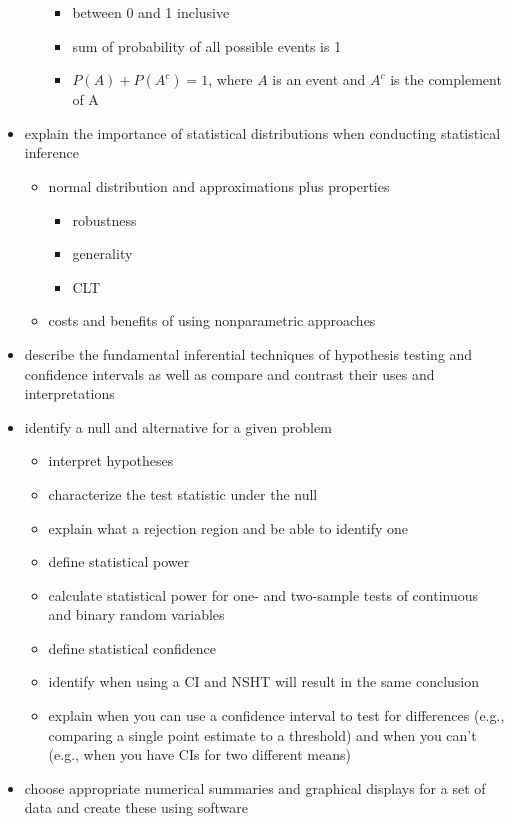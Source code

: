 \documentclass[]{book}
\providecommand{\tightlist}{%
  \setlength{\itemsep}{0pt}\setlength{\parskip}{0pt}}
\theoremstyle{definition}
\theoremstyle{definition}
\theoremstyle{definition}
\theoremstyle{remark}
\begin{document}
\begin{itemize}
\begin{itemize}
    \begin{itemize}
    \tightlist
    \item
      between 0 and 1 inclusive
    \item
      sum of probability of all possible events is 1
    \item
      \(P(A) + P(A^c) = 1\), where \(A\) is an event and \(A^c\) is the
      complement of A
    \end{itemize}
  \end{itemize}
\item
  explain the importance of statistical distributions when conducting
  statistical inference

  \begin{itemize}
  \tightlist
  \item
    normal distribution and approximations plus properties

    \begin{itemize}
    \tightlist
    \item
      robustness
    \item
      generality
    \item
      CLT
    \end{itemize}
  \item
    costs and benefits of using nonparametric approaches
  \end{itemize}
\item
  describe the fundamental inferential techniques of hypothesis testing
  and confidence intervals as well as compare and contrast their uses
  and interpretations
\item
  identify a null and alternative for a given problem

  \begin{itemize}
  \tightlist
  \item
    interpret hypotheses
  \item
    characterize the test statistic under the null
  \item
    explain what a rejection region and be able to identify one
  \item
    define statistical power
  \item
    calculate statistical power for one- and two-sample tests of
    continuous and binary random variables
  \item
    define statistical confidence\\
  \item
    identify when using a CI and NSHT will result in the same conclusion
  \item
    explain when you can use a confidence interval to test for
    differences (e.g., comparing a single point estimate to a threshold)
    and when you can't (e.g., when you have CIs for two different means)
  \end{itemize}
\item
  choose appropriate numerical summaries and graphical displays for a
  set of data and create these using software


\end{itemize}
\end{document}

